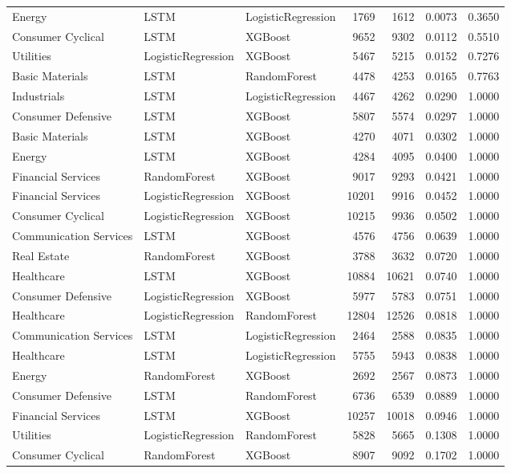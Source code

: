 \begin{longtable}{lllrrrr}
Energy & LSTM & LogisticRegression & 1769 & 1612 & 0.0073 & 0.3650 \\
Consumer Cyclical & LSTM & XGBoost & 9652 & 9302 & 0.0112 & 0.5510 \\
Utilities & LogisticRegression & XGBoost & 5467 & 5215 & 0.0152 & 0.7276 \\
Basic Materials & LSTM & RandomForest & 4478 & 4253 & 0.0165 & 0.7763 \\
Industrials & LSTM & LogisticRegression & 4467 & 4262 & 0.0290 & 1.0000 \\
Consumer Defensive & LSTM & XGBoost & 5807 & 5574 & 0.0297 & 1.0000 \\
Basic Materials & LSTM & XGBoost & 4270 & 4071 & 0.0302 & 1.0000 \\
Energy & LSTM & XGBoost & 4284 & 4095 & 0.0400 & 1.0000 \\
Financial Services & RandomForest & XGBoost & 9017 & 9293 & 0.0421 & 1.0000 \\
Financial Services & LogisticRegression & XGBoost & 10201 & 9916 & 0.0452 & 1.0000 \\
Consumer Cyclical & LogisticRegression & XGBoost & 10215 & 9936 & 0.0502 & 1.0000 \\
Communication Services & LSTM & XGBoost & 4576 & 4756 & 0.0639 & 1.0000 \\
Real Estate & RandomForest & XGBoost & 3788 & 3632 & 0.0720 & 1.0000 \\
Healthcare & LSTM & XGBoost & 10884 & 10621 & 0.0740 & 1.0000 \\
Consumer Defensive & LogisticRegression & XGBoost & 5977 & 5783 & 0.0751 & 1.0000 \\
Healthcare & LogisticRegression & RandomForest & 12804 & 12526 & 0.0818 & 1.0000 \\
Communication Services & LSTM & LogisticRegression & 2464 & 2588 & 0.0835 & 1.0000 \\
Healthcare & LSTM & LogisticRegression & 5755 & 5943 & 0.0838 & 1.0000 \\
Energy & RandomForest & XGBoost & 2692 & 2567 & 0.0873 & 1.0000 \\
Consumer Defensive & LSTM & RandomForest & 6736 & 6539 & 0.0889 & 1.0000 \\
Financial Services & LSTM & XGBoost & 10257 & 10018 & 0.0946 & 1.0000 \\
Utilities & LogisticRegression & RandomForest & 5828 & 5665 & 0.1308 & 1.0000 \\
Consumer Cyclical & RandomForest & XGBoost & 8907 & 9092 & 0.1702 & 1.0000 \\

\end{longtable}
